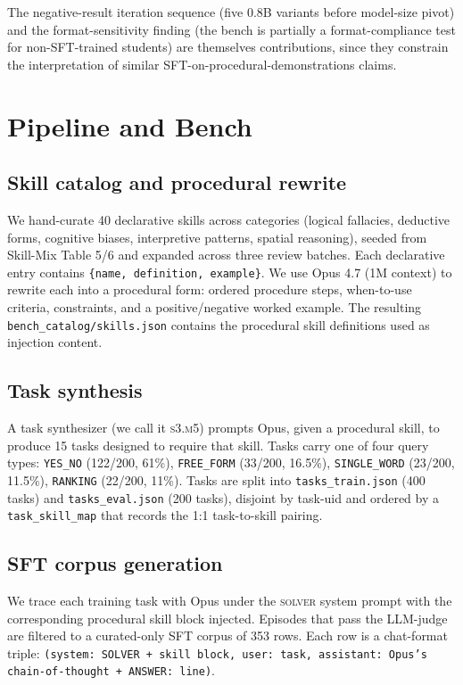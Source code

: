 \documentclass[10pt]{article}
\begin{document}
The negative-result iteration sequence (five 0.8B variants before model-size pivot) and the format-sensitivity finding (the bench is partially a format-compliance test for non-SFT-trained students) are themselves contributions, since they constrain the interpretation of similar SFT-on-procedural-demonstrations claims.

\section{Pipeline and Bench}

\subsection{Skill catalog and procedural rewrite}
We hand-curate 40 declarative skills across categories (logical fallacies, deductive forms, cognitive biases, interpretive patterns, spatial reasoning), seeded from Skill-Mix Table 5/6 \citep{yu2024skillmix} and expanded across three review batches. Each declarative entry contains \texttt{\{name, definition, example\}}. We use Opus 4.7 (1M context) to rewrite each into a procedural form: ordered procedure steps, when-to-use criteria, constraints, and a positive/negative worked example. The resulting \texttt{bench\_catalog/skills.json} contains the procedural skill definitions used as injection content.

\subsection{Task synthesis}
A task synthesizer (we call it \textsc{s3.m5}) prompts Opus, given a procedural skill, to produce 15 tasks designed to require that skill. Tasks carry one of four query types: \texttt{YES\_NO} (122/200, 61\%), \texttt{FREE\_FORM} (33/200, 16.5\%), \texttt{SINGLE\_WORD} (23/200, 11.5\%), \texttt{RANKING} (22/200, 11\%). Tasks are split into \texttt{tasks\_train.json} (400 tasks) and \texttt{tasks\_eval.json} (200 tasks), disjoint by task-uid and ordered by a \texttt{task\_skill\_map} that records the 1:1 task-to-skill pairing.

\subsection{SFT corpus generation}
We trace each training task with Opus under the \textsc{solver} system prompt with the corresponding procedural skill block injected. Episodes that pass the LLM-judge are filtered to a curated-only SFT corpus of 353 rows. Each row is a chat-format triple: \texttt{(system: SOLVER + skill block, user: task, assistant: Opus's chain-of-thought + ANSWER: line)}.
\end{document}
